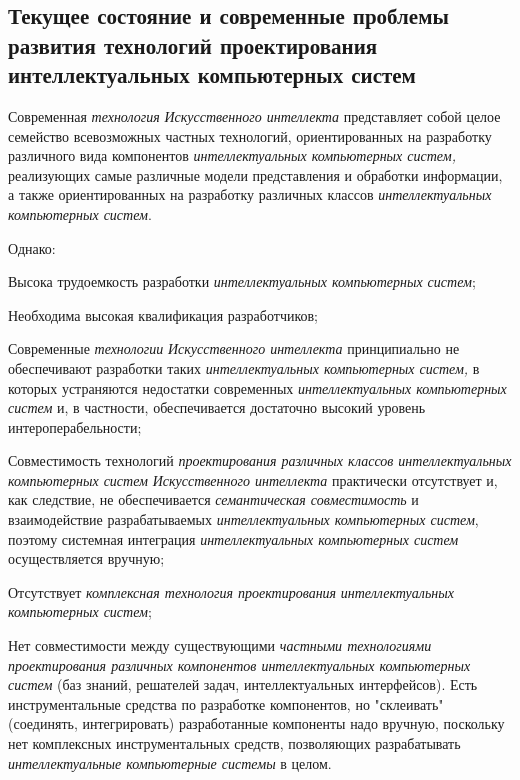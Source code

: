 \subsection{Текущее состояние и современные проблемы развития технологий проектирования интеллектуальных компьютерных систем}
\label{subsec_current_state_and_modern_problems_development_technology_designing_ICS}

Современная \textit{технология} \textit{Искусственного интеллекта} представляет собой целое семейство всевозможных частных технологий, ориентированных на разработку различного вида компонентов \textit{интеллектуальных компьютерных систем,} реализующих самые различные модели представления и обработки информации, а также ориентированных на разработку различных классов \textit{интеллектуальных компьютерных систем}.

Однако:

\begin{textitemize}
	\item
	Высока трудоемкость разработки \textit{интеллектуальных компьютерных систем};
	\item
	Необходима высокая квалификация разработчиков;
	\item
	Современные \textit{технологии} \textit{Искусственного интеллекта} принципиально не обеспечивают разработки таких \textit{интеллектуальных компьютерных систем,} в которых устраняются недостатки современных \textit{интеллектуальных компьютерных систем} и, в частности, обеспечивается достаточно высокий уровень интероперабельности;
	\item
	Совместимость технологий \textit{проектирования различных классов интеллектуальных компьютерных систем} \textit{Искусственного интеллекта} практически отсутствует и, как следствие, не обеспечивается \textit{семантическая совместимость} и взаимодействие разрабатываемых \textit{интеллектуальных компьютерных систем}, поэтому системная интеграция \textit{интеллектуальных компьютерных систем} осуществляется вручную;
	\item
	Отсутствует \textit{комплексная технология проектирования} \textit{интеллектуальных компьютерных систем};
	\item
	Нет совместимости между существующими \textit{частными технологиями проектирования различных компонентов интеллектуальных компьютерных систем} (баз знаний, решателей задач, интеллектуальных интерфейсов). Есть инструментальные средства по разработке компонентов, но "склеивать" (соединять, интегрировать) разработанные компоненты надо вручную, поскольку нет комплексных инструментальных средств, позволяющих разрабатывать \textit{интеллектуальные компьютерные системы} в целом.
\end{textitemize}

